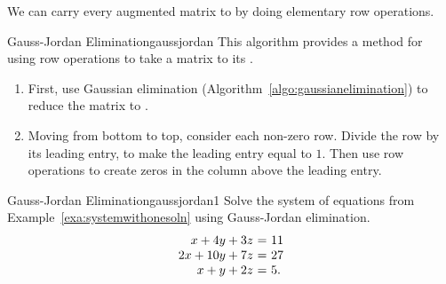 We can carry every augmented matrix to {\rref} by doing elementary row
operations.

\begin{algorithm}{Gauss-Jordan Elimination}{gaussjordan}
  This algorithm provides a method for using row operations to take a
  matrix to its
  {\rref} .
  \begin{enumerate}
  \item First, use Gaussian elimination
    (Algorithm~\ref{algo:gaussianelimination}) to reduce the matrix to
    {\ef}.
  \item Moving from bottom to top, consider each non-zero row. Divide
    the row by its leading entry, to make the leading entry equal to
    $1$. Then use row operations to create zeros in the column above
    the leading entry.
  \end{enumerate}
\end{algorithm}

\begin{example}{Gauss-Jordan Elimination}{gaussjordan1}
  Solve the system of equations from
  Example~\ref{exa:systemwithonesoln} using Gauss-Jordan elimination.
  \begin{equation*}
    \begin{array}{r@{~}c@{~}l}
      x+4y+3z &=& 11\\
      2x+10y+7z &=& 27\\
      x+y+2z &=& 5.
    \end{array}
  \end{equation*}
\end{example}

